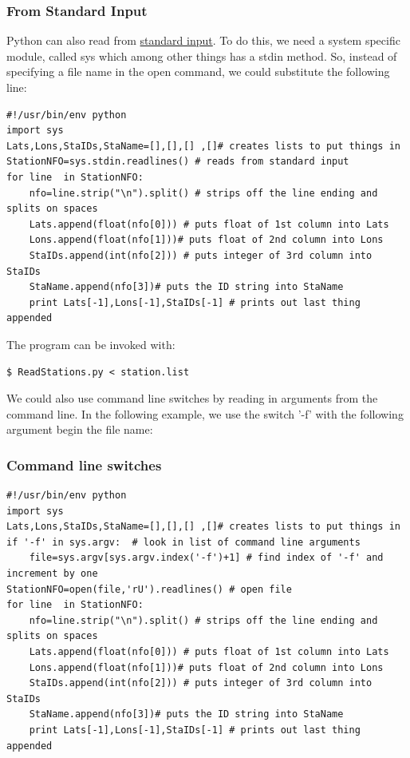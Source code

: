 \documentclass[11pt]{book}
\begin{document}
{{{{ \subsubsection{From  Standard Input }

Python can also read from \href{#standard_IO}{standard input}.  To do this, we need a system specific module, called {\color{blue}sys} which among other things has a {\color{blue}stdin} method.  So, instead of specifying a file name in the {\color{blue}open} command, we could substitute the following line:


{ \color{blue} \begin{verbatim}
#!/usr/bin/env python
import sys
Lats,Lons,StaIDs,StaName=[],[],[] ,[]# creates lists to put things in
StationNFO=sys.stdin.readlines() # reads from standard input
for line  in StationNFO:
    nfo=line.strip("\n").split() # strips off the line ending and splits on spaces
    Lats.append(float(nfo[0])) # puts float of 1st column into Lats
    Lons.append(float(nfo[1]))# puts float of 2nd column into Lons
    StaIDs.append(int(nfo[2])) # puts integer of 3rd column into StaIDs
    StaName.append(nfo[3])# puts the ID string into StaName
    print Lats[-1],Lons[-1],StaIDs[-1] # prints out last thing appended
\end{verbatim}}

\noindent The program can be invoked with:

{\color{blue}\begin{verbatim}
$ ReadStations.py < station.list
\end{verbatim}}

We could also use command line switches by reading in arguments from the command line.  In the following example, we use the switch '-f' with the following argument begin the file name:

\subsubsection{Command line switches}

{ \color{blue} \begin{verbatim}
#!/usr/bin/env python
import sys
Lats,Lons,StaIDs,StaName=[],[],[] ,[]# creates lists to put things in
if '-f' in sys.argv:  # look in list of command line arguments
    file=sys.argv[sys.argv.index('-f')+1] # find index of '-f' and increment by one
StationNFO=open(file,'rU').readlines() # open file
for line  in StationNFO:
    nfo=line.strip("\n").split() # strips off the line ending and splits on spaces
    Lats.append(float(nfo[0])) # puts float of 1st column into Lats
    Lons.append(float(nfo[1]))# puts float of 2nd column into Lons
    StaIDs.append(int(nfo[2])) # puts integer of 3rd column into StaIDs
    StaName.append(nfo[3])# puts the ID string into StaName
    print Lats[-1],Lons[-1],StaIDs[-1] # prints out last thing appended
\end{verbatim}}

}}}}
\end{document}
